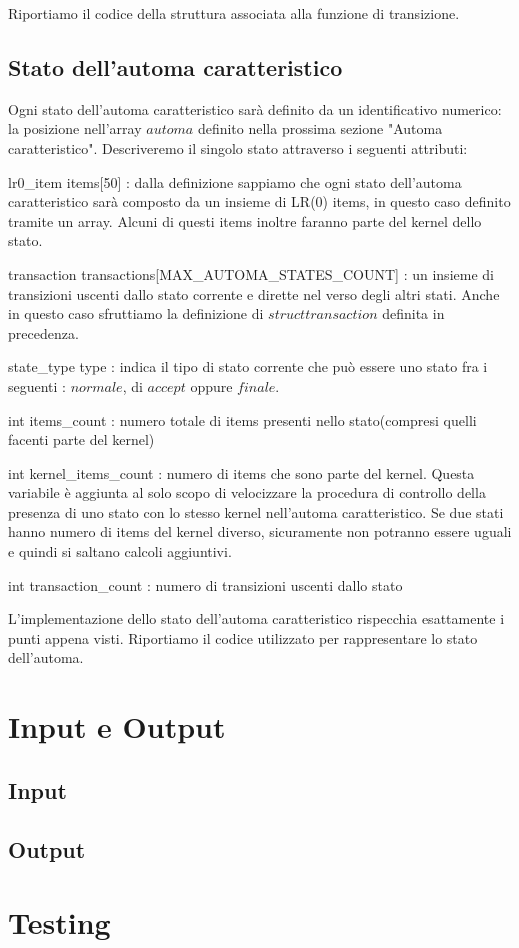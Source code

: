 \documentclass[12pt]{article}
\begin{document}
Riportiamo il codice della struttura associata alla funzione di transizione.




\subsection{Stato dell'automa caratteristico}
Ogni stato dell'automa caratteristico sarà definito da un identificativo numerico: la posizione nell'array $automa$ definito nella prossima sezione "Automa caratteristico". Descriveremo il singolo stato attraverso i seguenti attributi:
\begin{list}{-}{}
\item lr0\_item items[50] : dalla definizione sappiamo che ogni stato dell'automa caratteristico sarà composto da un insieme di LR(0) items, in questo caso definito tramite un array. Alcuni di questi items inoltre faranno parte del kernel dello stato.
\item transaction transactions[MAX\_AUTOMA\_STATES\_COUNT] : un insieme di transizioni uscenti dallo stato corrente e dirette nel verso degli altri stati. Anche in questo caso sfruttiamo la definizione di $struct transaction$ definita in precedenza.
\item state\_type type : indica il tipo di stato corrente che può essere uno stato fra i seguenti : $normale$, di $accept$ oppure $finale$.
\item int items\_count : numero totale di items presenti nello stato(compresi quelli facenti parte del kernel)
\item int kernel\_items\_count : numero di items che sono parte del kernel. Questa variabile è aggiunta al solo scopo di velocizzare la procedura di controllo della presenza di uno stato con lo stesso kernel nell'automa caratteristico. Se due stati hanno numero di items del kernel diverso, sicuramente non potranno essere uguali e quindi si saltano calcoli aggiuntivi.
\item int transaction\_count : numero di transizioni uscenti dallo stato
\end{list}

L'implementazione dello stato dell'automa caratteristico rispecchia esattamente i punti appena visti.
Riportiamo il codice utilizzato per rappresentare lo stato dell'automa.




\section{Input e Output}

\subsection{Input}

\subsection{Output}

\section{Testing}
\end{document}
